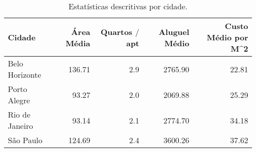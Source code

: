 \begin{table}[H]
\caption{\label{tab:exploratoria} Estatísticas descritivas por cidade.}
\begin{tabular}{l|r|r|r|r}

\hline
Cidade & Área Média & Quartos $/$ apt & Aluguel Médio & Custo Médio por M^2\\
\hline
Belo Horizonte & 136.71 & 2.9 & 2765.90 & 22.81\\
\hline
Porto Alegre & 93.27 & 2.0 & 2069.88 & 25.29\\
\hline
Rio de Janeiro & 93.14 & 2.1 & 2774.70 & 34.18\\
\hline
São Paulo & 124.69 & 2.4 & 3600.26 & 37.62\\
\hline
\end{tabular}
\end{table}
